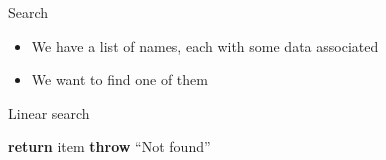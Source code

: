 \newcommand{\namessorted}{
	\fbox{\parbox{0.9\textwidth}{\tiny
		Anderson, Martha \par
		Baker, Theresa \par
		Brown, Janet \par
		Clark, Stephanie \par
		Collins, Jane \par
		Cox, Shirley \par
		Davis, Marilyn \par
		Diaz, Harold \par
		Gonzalez, Adam \par
		Henderson, Lawrence \par
		Hughes, Aaron \par
		Kelly, Philip \par
		Lewis, Rose \par
		Lopez, Jeffrey \par
		Miller, Jeremy \par
		Parker, Debra \par
		Perez, Diana \par
		Russell, Mildred \par
		Sanders, Phillip \par
		Scott, Michelle \par
		Stewart, Howard \par
		Ward, Jessica \par
		White, Amanda \par
		Williams, Billy \par
		Young, Frank
	}}
}

\begin{frame}{Search}
			\begin{itemize}
				\item We have a list of names, each with some data associated \pause
				\item We want to find one of them
			\end{itemize}
\end{frame}

\begin{frame}{Linear search}
			\begin{algorithmic}
				 \pause
					 \pause
						 \pause
							\State \textbf{return} item \pause
						\EndIf
					\EndFor
					\State \textbf{throw} ``Not found'' \pause
				\EndProcedure
			\end{algorithmic}
\end{frame}

